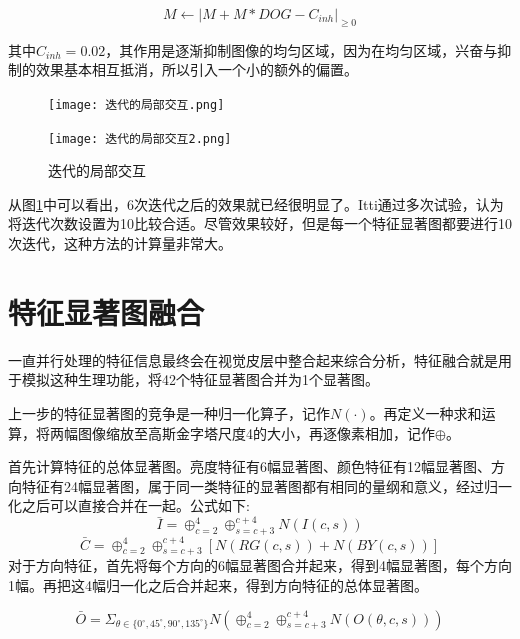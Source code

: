 \documentclass[a4paper,10pt]{article}\large
\begin{document}
\begin{equation}
M\leftarrow|M+M*DOG-C_{inh}|_{\geq 0}
\end{equation}

其中$C_{inh}=0.02$，其作用是逐渐抑制图像的均匀区域，因为在均匀区域，兴奋与抑制的效果基本相互抵消，所以引入一个小的额外的偏置。

\begin{figure}[!ht]
\begin{minipage}[c]{1.0\textwidth}
\centering
\texttt{[image: 迭代的局部交互.png]}
\end{minipage}
\hspace{1ex}
\begin{minipage}[c]{1.0\textwidth}
\centering
\texttt{[image: 迭代的局部交互2.png]}
\end{minipage}
\caption{迭代的局部交互}\label{fig:10}
\end{figure} 

从图\ref{fig:10}中可以看出，6次迭代之后的效果就已经很明显了。Itti通过多次试验，认为将迭代次数设置为10比较合适。尽管效果较好，但是每一个特征显著图都要进行10次迭代，这种方法的计算量非常大。

\section{特征显著图融合}

一直并行处理的特征信息最终会在视觉皮层中整合起来综合分析，特征融合就是用于模拟这种生理功能，将42个特征显著图合并为1个显著图。


上一步的特征显著图的竞争是一种归一化算子，记作$N(\cdot)$。再定义一种求和运算，将两幅图像缩放至高斯金字塔尺度4的大小，再逐像素相加，记作$\oplus$。


首先计算特征的总体显著图。亮度特征有6幅显著图、颜色特征有12幅显著图、方向特征有24幅显著图，属于同一类特征的显著图都有相同的量纲和意义，经过归一化之后可以直接合并在一起。公式如下:
\begin{equation}
\bar{I}=\oplus_{c=2}^{4}\oplus_{s=c+3}^{c+4}N(I(c,s))
\end{equation}
\begin{equation}
\bar{C}=\oplus_{c=2}^{4}\oplus_{s=c+3}^{c+4}[N(RG(c,s))+N(BY(c,s))]
\end{equation}
对于方向特征，首先将每个方向的6幅显著图合并起来，得到4幅显著图，每个方向1幅。再把这4幅归一化之后合并起来，得到方向特征的总体显著图。

\begin{equation}
\bar{O}=\Sigma_{\theta\in\{0^\circ,45^\circ,90^\circ,135^\circ \}}N(\oplus_{c=2}^{4}\oplus_{s=c+3}^{c+4}N(O(\theta,c,s)))
\end{equation}
\end{document}
